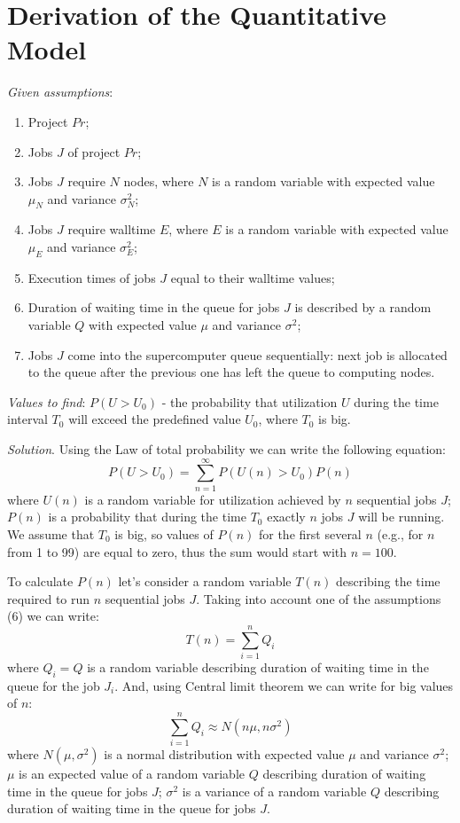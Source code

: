 \section{Derivation of the Quantitative Model} \label{appendix-model-derivation}

\textit{Given assumptions}:
\begin{enumerate}
    \item Project $Pr$;
    \item Jobs $J$ of project $Pr$;
    \item Jobs $J$ require $N$ nodes, where $N$ is a random variable with expected value $\mu_{N}$ and variance $\sigma_{N}^2$;
    \item Jobs $J$ require walltime $E$, where $E$ is a random variable with expected value $\mu_{E}$ and variance $\sigma_{E}^2$;
    \item Execution times of jobs $J$ equal to their walltime values;
    \item Duration of waiting time in the queue for jobs $J$ is described by a random variable $Q$ with expected value $\mu$ and variance $\sigma^2$;
    \item Jobs $J$ come into the supercomputer queue sequentially: next job is allocated to the queue after the previous one has left the queue to computing nodes.
\end{enumerate}
\textit{Values to find}:
$P(U > U_0)$ - the probability that utilization $U$ during the time interval $T_0$ will exceed the predefined value $U_0$, where $T_0$ is big.

\textit{Solution}.
Using the Law of total probability we can write the following equation:
\begin{equation}
    \label{eq-1}
    P(U > U_0) = \sum\limits_{n=1}^{\infty}P(U(n) > U_0) P(n)
\end{equation}
where $U(n)$ is a random variable for utilization achieved by $n$ sequential jobs $J$; $P(n)$ is a probability that during the time $T_0$ exactly $n$ jobs $J$ will be running. We assume that $T_0$ is big, so values of $P(n)$ for the first several $n$ (e.g., for $n$ from 1 to 99) are equal to zero, thus the sum would start with $n=100$.

To calculate $P(n)$ let's consider a random variable $T(n)$ describing the time required to run $n$ sequential jobs $J$. Taking into account one of the assumptions (6) we can write:
\begin{equation}
    \label{eq-2}
    T(n) = \sum\limits_{i=1}^{n}Q_{i}
\end{equation}
where $Q_{i} = Q$ is a random variable describing duration of waiting time in the queue for the job $J_{i}$. And, using Central limit theorem we can write for big values of $n$:
\begin{equation}
    \label{eq-3}
    \sum\limits_{i=1}^{n}Q_{i} \approx N(n\mu, n\sigma^2)
\end{equation}
where $N(\mu, \sigma^2)$ is a normal distribution with expected value $\mu$ and variance $\sigma^2$; $\mu$ is an expected value of a random variable $Q$ describing duration of waiting time in the queue for jobs $J$; $\sigma^2$ is a variance of a random variable $Q$ describing duration of waiting time in the queue for jobs $J$.

